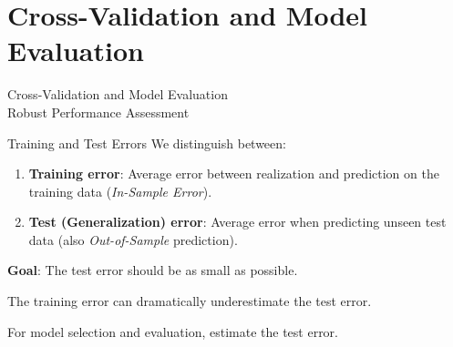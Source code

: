 \documentclass[11pt]{beamer}
\begin{document}


\section{Cross-Validation and Model Evaluation}

\begin{frame}
	\begin{center}
		\Large
		Cross-Validation and Model Evaluation\\
		\vspace{0.5cm}
		\normalsize
		Robust Performance Assessment
	\end{center}
\end{frame}

\begin{frame}{Training and Test Errors}
    We distinguish between:
    \begin{enumerate}
        \item \textbf{Training error}: Average error between realization and prediction on the training data (\textit{In-Sample Error}).
        \item \textbf{Test (Generalization) error}: Average error when predicting unseen test data (also \textit{Out-of-Sample} prediction).
    \end{enumerate}
    \medskip

    \textbf{Goal}: The test error should be as small as possible.
    \medskip

    The training error can dramatically underestimate the test error.
    \medskip

    For model selection and evaluation, estimate the test error.
\end{frame}
\end{document}
